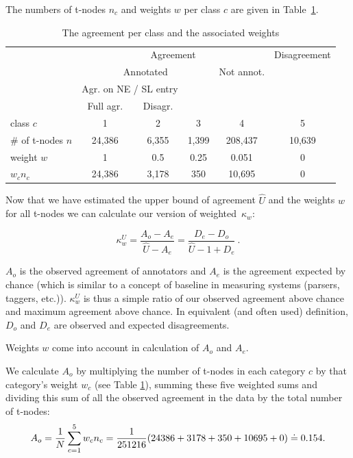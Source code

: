 The numbers of t-nodes $n_c$ and weights $w$ per class $c$ are given in Table~\ref{tab-agreement}.

\begin{table}[H]
\begin{center}
 \begin{tabular}{l|c|c|c|c|c}

&\multicolumn{4}{c|}{Agreement} & Disagreement\\
\cline{2-6}
&\multicolumn{3}{c|}{Annotated} & Not annot. &  \\
\cline{2-5}
&\multicolumn{2}{c|}{Agr. on NE / SL entry} &&&\\
\cline{2-3}
&Full agr. & Disagr. &&&\\
\cline{1-6}
class $c$& 1 & 2 & 3 & 4 & 5\\
\cline{1-6}
\# of t-nodes $n$& 24,386 & 6,355 & 1,399 & 208,437 & 10,639\\
\cline{1-6}
weight $w$ & 1 & 0.5 & 0.25 & 0.051 & 0 \\
\cline{1-6}
$w_c n_c$ & 24,386 & 3,178 & 350 & 10,695 & 0\\
\end{tabular}
\end{center}
\caption{The agreement per class and the associated weights}
\label{tab-agreement}
\end{table}


Now that we have estimated the upper bound of agreement $\widehat{U}$ and the weights $w$ for all t-nodes we can calculate our version of weighted~$\kappa_w$:

\begin{equation}
\label{ourkappa}
\kappa_w^U = \frac{A_o - A_e}{\widehat{U} - A_e} =
             \frac{D_e - D_o}{\widehat{U} - 1 + D_e}\ .
\end{equation}

$A_o$ is the observed agreement of annotators and $A_e$ is the agreement expected by chance (which is similar to a concept of baseline in measuring systems (parsers, taggers, etc.)). $\kappa_w^U$ is thus a simple ratio of our observed agreement above chance and maximum agreement above chance. In equivalent (and often used) definition, $D_o$ and $D_e$ are observed and expected disagreements.

Weights $w$ come into account in calculation of $A_o$ and $A_e$.

We calculate $A_o$ by multiplying the number of t-nodes in each category $c$ by that category's weight $w_c$ (see Table \ref{tab-agreement}), summing these five weighted sums and dividing this sum of all the observed agreement in the data by the total number of t-nodes:
\[	A_o = \frac{1}{N} \sum_{c =1}^{5} w_c n_c = \\
	 \frac{1}{251216} (24386 + 3178 + 350 + 10695 + 0) \doteq 0.154.
	\]

